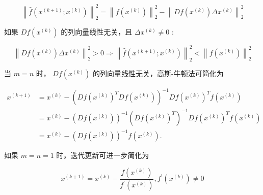 \begin{equation} \left\|\hat{f}\left(x^{(k+1)} ; x^{(k)}\right)\right\|_{2}^{2}=\left\|f\left(x^{(k)}\right)\right\|_{2}^{2}-\left\|D f\left(x^{(k)}\right) \Delta x^{(k)}\right\|_{2}^{2} \end{equation}

如果 $ D f\left(x^{(k)}\right) $ 的列向量线性无关，且 $ \Delta x^{(k)} \neq 0 $ :

\begin{equation} \left\|D f\left(x^{(k)}\right) \Delta x^{(k)}\right\|_{2}^{2}>0 \Rightarrow\left\|\hat{f}\left(x^{(k+1)} ; x^{(k)}\right)\right\|_{2}^{2}<\left\|f\left(x^{(k)}\right)\right\|_{2}^{2} \end{equation}

当 $ {m}={n} $ 时， $ D f\left(x^{(k)}\right) $ 的列向量线性无关，高斯-牛顿法可简化为

\begin{equation}
\begin{aligned}
x^{(k+1)} &=x^{(k)}-\left(D f\left(x^{(k)}\right)^{T} D f\left(x^{(k)}\right)\right)^{-1} D f\left(x^{(k)}\right)^{T} f\left(x^{(k)}\right) \\
&=x^{(k)}-\left(D f\left(x^{(k)}\right)\right)^{-1}\left(D f\left(x^{(k)}\right)^{T}\right)^{-1} D f\left(x^{(k)}\right)^{T} f\left(x^{(k)}\right) \\
&=x^{(k)}-\left(D f\left(x^{(k)}\right)\right)^{-1} f\left(x^{(k)}\right) .
\end{aligned}
\end{equation}


如果 $ m=n=1 $ 时，迭代更新可进一步简化为

\begin{equation} x^{(k+1)}=x^{(k)}-\frac{f\left(x^{(k)}\right)}{f^{\prime}\left(x^{(k)}\right)}, f^{\prime}\left(x^{(k)}\right) \neq 0 \end{equation}

